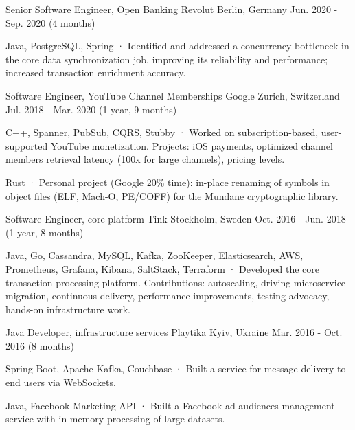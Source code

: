 \begin{cventries}
  \cventry
    {Senior Software Engineer, Open Banking} %
    {Revolut} %
    {Berlin, Germany} %
    {Jun. 2020 - Sep. 2020 (4 months)} %
    {
      \begin{cvitems} %
        \item {Java, PostgreSQL, Spring · Identified and addressed a concurrency bottleneck in the core data synchronization job, improving its reliability and performance; increased transaction enrichment accuracy.}
      \end{cvitems}
    }

  \cventry
    {Software Engineer, YouTube Channel Memberships} %
    {Google} %
    {Zurich, Switzerland} %
    {Jul. 2018 - Mar. 2020 (1 year, 9 months)} %
    {
      \begin{cvitems}
        \item {C++, Spanner, PubSub, CQRS, Stubby · Worked on subscription-based, user-supported YouTube monetization. Projects: iOS payments, optimized channel members retrieval latency (100x for large channels), pricing levels.}
        \item {Rust · Personal project (Google 20\% time): in-place renaming of symbols in object files (ELF, Mach-O, PE/COFF) for the Mundane cryptographic library.}
      \end{cvitems}
    }

  \cventry
    {Software Engineer, core platform} %
    {Tink} %
    {Stockholm, Sweden} %
    {Oct. 2016 - Jun. 2018 (1 year, 8 months)} %
    {
      \begin{cvitems} %
        \item {Java, Go, Cassandra, MySQL, Kafka, ZooKeeper, Elasticsearch, AWS, Prometheus, Grafana, Kibana, SaltStack, Terraform · Developed the core transaction-processing platform. Contributions: autoscaling, driving microservice migration, continuous delivery, performance improvements, testing advocacy, hands-on infrastructure work.}
      \end{cvitems}
    }

  \cventry
    {Java Developer, infrastructure services} %
    {Playtika} %
    {Kyiv, Ukraine} %
    {Mar. 2016 - Oct. 2016 (8 months)} %
    {
      \begin{cvitems} %
        \item {Spring Boot, Apache Kafka, Couchbase · Built a service for message delivery to end users via WebSockets.}
        \item {Java, Facebook Marketing API · Built a Facebook ad-audiences management service with in-memory processing of large datasets.}
      \end{cvitems}
    }


\end{cventries}
